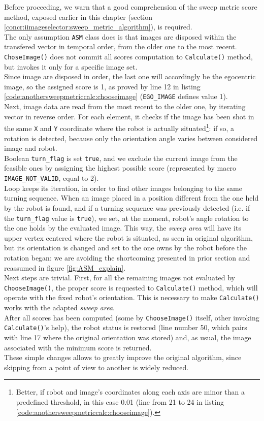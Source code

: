 Before proceeding, we warn that a good comprehension
of the sweep metric score method, exposed earlier in this chapter
(section \ref{concr:iimageselector:sweep_metric_algorithm}),
is required.
\\
The only assumption \texttt{ASM} class does is that images are disposed within
the transfered vector in temporal order, from the older one
to the most recent. \texttt{ChoseImage()} does not commit all scores
computation to \texttt{Calculate()} method, but invokes it only
for a specific image set.
\\
Since image are disposed in order, the last one will accordingly be
the egocentric image, so the assigned score is 1, as proved by
line 12 in listing \ref{code:anothersweepmetriccalc:chooseimage}
(\texttt{EGO\_IMAGE} defines value 1).
\\
Next, image data are read from the most recent to the older one,
by iterating vector in reverse order. For each element, it checks
if the image has been shot in the same \texttt{X} and \texttt{Y} coordinate
where the robot is actually
situated\footnote{Better, if robot and image's coordinates along each axis
are minor than a predefined threshold, in this case 0.01
(line from 21 to 24 in listing \ref{code:anothersweepmetriccalc:chooseimage}).}:
if so, a rotation is detected, because only the orientation angle
varies between considered image and robot.
\\
Boolean \texttt{turn\_flag} is set \texttt{true}, and we exclude the
current image from the feasible ones by assigning the highest possible
score (represented by macro \texttt{IMAGE\_NOT\_VALID}, equal to 2).
\\
Loop keeps its iteration,  in order to find other images belonging
to the same turning sequence. When an image placed in a position
different from the one held by the robot is found, and if a turning sequence
was previously detected (i.e. if the \texttt{turn\_flag} value is
\texttt{true}), we set, at the moment, robot's angle rotation to
the one holds by the evaluated image. This way, the \textit{sweep
area} will have its upper vertex centered where the robot is situated,
as seen in original algorithm, but its orientation is changed and
set to the one owns by the
robot before the rotation began: we are avoiding the shortcoming
presented in prior section and reassumed in figure \ref{fig:ASM_explain}.
\\
Next steps are trivial. First, for all the remaining images not
evaluated by \texttt{ChooseImage()}, the proper score is requested
to \texttt{Calculate()} method, which will operate with the fixed
robot's orientation. This is necessary to make \texttt{Calculate()}
works with the adapted \textit{sweep area}.
\\
After all scores has been computed (some by \texttt{ChooseImage()}
itself, other invoking \texttt{Calculate()}'s help), the robot
status is restored (line number 50, which pairs with line 17 where
the original orientation was stored) and, as usual, the image associated
with the minimum score is returned.
\\
These simple changes allows to greatly improve the original algorithm,
since skipping from a point of view to another is widely reduced.
